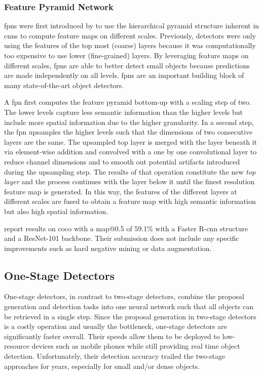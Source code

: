 \documentclass[final]{vutinfth} %
\begin{document}
\subsubsection{Feature Pyramid Network}
\label{sssec:theory-fpn}

\glspl{fpn} were first introduced by \textcite{lin2017} to use the
hierarchical pyramid structure inherent in \glspl{cnn} to compute
feature maps on different scales. Previously, detectors were only
using the features of the top most (coarse) layers because it was
computationally too expensive to use lower (fine-grained) layers. By
leveraging feature maps on different scales, \glspl{fpn} are able to
better detect small objects because predictions are made independently
on all levels. \glspl{fpn} are an important building block of many
state-of-the-art object detectors.

A \gls{fpn} first computes the feature pyramid bottom-up with a
scaling step of two. The lower levels capture less semantic
information than the higher levels but include more spatial
information due to the higher granularity. In a second step, the
\gls{fpn} upsamples the higher levels such that the dimensions of two
consecutive layers are the same. The upsampled top layer is merged
with the layer beneath it via element-wise addition and convolved with
a one by one convolutional layer to reduce channel dimensions and to
smooth out potential artifacts introduced during the upsampling
step. The results of that operation constitute the new \emph{top
  layer} and the process continues with the layer below it until the
finest resolution feature map is generated. In this way, the features
of the different layers at different scales are fused to obtain a
feature map with high semantic information but also high spatial
information.

\textcite{lin2017} report results on \gls{coco} with a \gls{map}@0.5
of 59.1\% with a Faster R-\gls{cnn} structure and a ResNet-101
backbone. Their submission does not include any specific improvements
such as hard negative mining \cite{shrivastava2016} or data
augmentation.

\subsection{One-Stage Detectors}
\label{ssec:theory-one-stage}

One-stage detectors, in contrast to two-stage detectors, combine the
proposal generation and detection tasks into one neural network such
that all objects can be retrieved in a single step. Since the proposal
generation in two-stage detectors is a costly operation and usually
the bottleneck, one-stage detectors are significantly faster
overall. Their speeds allow them to be deployed to low-resource
devices such as mobile phones while still providing real time object
detection. Unfortunately, their detection accuracy trailed the
two-stage approaches for years, especially for small and/or dense
objects.
\end{document}
